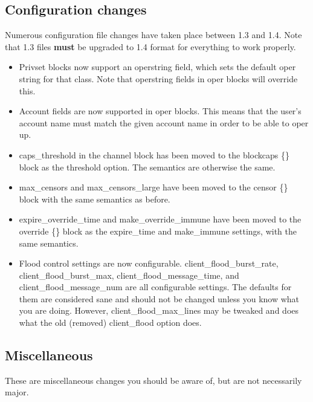 \subsection{Configuration changes}

Numerous configuration file changes have taken place between 1.3 and 1.4. Note
that 1.3 files \textbf{must} be upgraded to 1.4 format for everything to work
properly.

\begin{itemize}

\item{
	Privset blocks now support an operstring field, which sets the default
	oper string for that class. Note that operstring fields in oper blocks
	will override this.
}

\item{
	Account fields are now supported in oper blocks. This means that the
	user's account name must match the given account name in order to be
	able to oper up.
}

\item{
	caps\_threshold in the channel block has been moved to the blockcaps
	\{\} block as the threshold option. The semantics are otherwise the
	same.
}

\item{
	max\_censors and max\_censors\_large have been moved to the censor \{\}
	block with the same semantics as before.
}

\item{
	expire\_override\_time and make\_override\_immune have been moved to
	the override \{\} block as the expire\_time and make\_immune settings,
	with the same semantics.
}

\item{
	Flood control settings are now configurable.
	client\_flood\_burst\_rate, client\_flood\_burst\_max,
	client\_flood\_message\_time, and client\_flood\_message\_num are all
	configurable settings. The defaults for them are considered sane and
	should not be changed unless you know what you are doing. However,
	client\_flood\_max\_lines may be tweaked and
	does what the old (removed) client\_flood option does.
}

\end{itemize}


\subsection{Miscellaneous}

These are miscellaneous changes you should be aware of, but are not necessarily
major.

